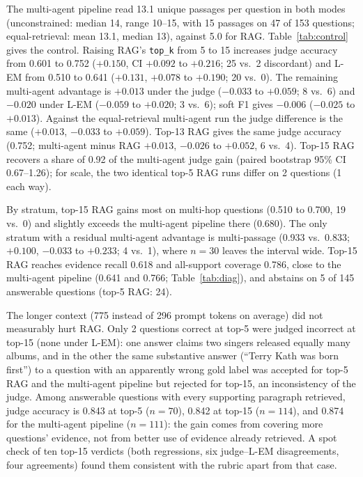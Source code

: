 \documentclass[11pt,a4paper]{article}
\newcommand{\lem}{L-EM}
\begin{document}
The multi-agent pipeline read 13.1 unique passages per question in both modes
(unconstrained: median 14, range 10--15, with 15 passages on 47 of 153
questions; equal-retrieval: mean 13.1, median 13), against 5.0 for RAG.
Table~\ref{tab:control} gives the control.
Raising RAG's \texttt{top\_k} from 5 to 15 increases judge accuracy from
0.601 to 0.752 ($+0.150$, CI $+0.092$ to $+0.216$; 25 vs.\ 2 discordant) and
\lem{} from 0.510 to 0.641 ($+0.131$, $+0.078$ to $+0.190$; 20 vs.\ 0).
The remaining multi-agent advantage is $+0.013$ under the judge ($-0.033$ to
$+0.059$; 8 vs.\ 6) and $-0.020$ under \lem{} ($-0.059$ to $+0.020$; 3 vs.\
6); soft F1 gives $-0.006$ ($-0.025$ to $+0.013$).
Against the equal-retrieval multi-agent run the judge difference is the same
($+0.013$, $-0.033$ to $+0.059$).
Top-13 RAG gives the same judge accuracy (0.752; multi-agent minus RAG
$+0.013$, $-0.026$ to $+0.052$, 6 vs.\ 4).
Top-15 RAG recovers a share of 0.92 of the multi-agent judge gain (paired
bootstrap 95\% CI 0.67--1.26); for scale, the two identical top-5 RAG runs
differ on 2 questions (1 each way).

By stratum, top-15 RAG gains most on multi-hop questions (0.510 to 0.700,
19 vs.\ 0) and slightly exceeds the multi-agent pipeline there (0.680).
The only stratum with a residual multi-agent advantage is multi-passage
(0.933 vs.\ 0.833; $+0.100$, $-0.033$ to $+0.233$; 4 vs.\ 1), where $n{=}30$
leaves the interval wide.
Top-15 RAG reaches evidence recall 0.618 and all-support coverage 0.786,
close to the multi-agent pipeline (0.641 and 0.766; Table~\ref{tab:diag}),
and abstains on 5 of 145 answerable questions (top-5 RAG: 24).

The longer context (775 instead of 296 prompt tokens on average) did not
measurably hurt RAG.
Only 2 questions correct at top-5 were judged incorrect at top-15 (none under
\lem{}): one answer claims two singers released equally many albums, and in
the other the same substantive answer (``Terry Kath was born first'') to a question with
an apparently wrong gold label was accepted for top-5 RAG and the multi-agent
pipeline but rejected for top-15, an inconsistency of the judge.
Among answerable questions with every supporting paragraph retrieved, judge
accuracy is 0.843 at top-5 ($n{=}70$), 0.842 at top-15 ($n{=}114$), and
0.874 for the multi-agent pipeline ($n{=}111$): the gain comes from covering
more questions' evidence, not from better use of evidence already retrieved.
A spot check of ten top-15 verdicts (both regressions, six judge--\lem{}
disagreements, four agreements) found them consistent with the rubric apart
from that case.
\end{document}
